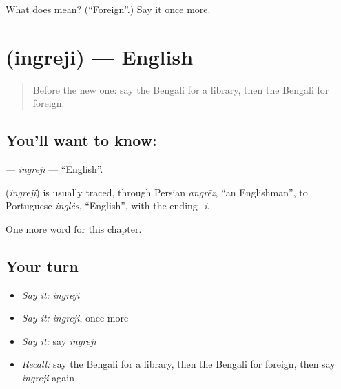 \begin{tcolorbox}[breakable,colback=teal!4,colframe=teal!35!black,title={Before you move on}]
What does  mean? (\textquotedblleft{}Foreign\textquotedblright{}.) Say it once more.
\end{tcolorbox}
\section[\texorpdfstring{\bn{ইংরেজি} (ingreji)}{ইংরেজি (ingreji)}]{ (ingreji) — English}

\label{lesson:BN-C246-ingreji}



\begin{quote}
Before the new one: say the Bengali for a library, then the Bengali for foreign.
\end{quote}

\subsection*{You'll want to know: }
\textbf{} — \emph{ingreji} — \textquotedblleft{}English\textquotedblright{}.

\begin{cousinweb}
\textbf{} (\emph{ingreji}) is usually traced, through Persian \emph{angrēz}, \textquotedblleft{}an Englishman\textquotedblright{}, to Portuguese \emph{inglês}, \textquotedblleft{}English\textquotedblright{}, with the ending \emph{-i}.
\end{cousinweb}

\begin{grammarlens}[title={What you've built}]
One more word for this chapter.
\end{grammarlens}

\subsection*{Your turn}
\begin{itemize}
\raggedright
  \item \emph{Say it:} \emph{ingreji}
  \item \emph{Say it:} \emph{ingreji}, once more
  \item \emph{Say it:} say \emph{ingreji}
  \item \emph{Recall:} say the Bengali for a library, then the Bengali for foreign, then say \emph{ingreji} again
\end{itemize}

